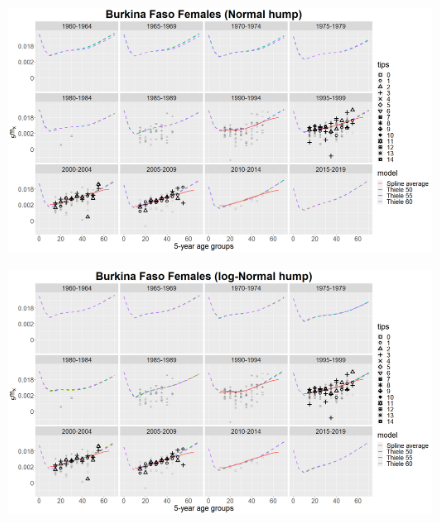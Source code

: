 \documentclass[12pt,a4paper]{article}
\begin{document}
\newpage
\begin{figure}[H]
\includegraphics[width = \linewidth]{dhs females normal.png}
\end{figure}
\begin{figure}[H]
\includegraphics[width = \linewidth]{dhs females log-normal.png}
\end{figure}
\end{document}
